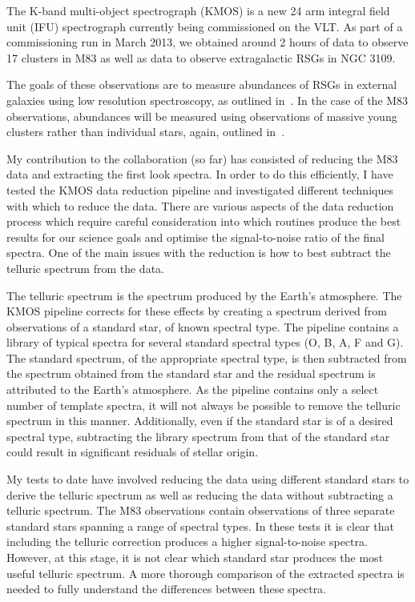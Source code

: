 \documentclass[a4paper,12pt]{article}
\begin{document}
The K-band multi-object spectrograph (KMOS) is a new 24 arm integral field unit (IFU) spectrograph currently being commissioned on the VLT. 
As part of a commissioning run in March 2013, we obtained around 2 hours of data to observe 17 clusters in M83 as well as data to observe extragalactic RSGs in NGC 3109.
 
The goals of these observations are to measure abundances of RSGs in external galaxies using low resolution spectroscopy, as outlined in~\cite{Davies13b}.
In the case of the M83 observations, abundances will be measured using observations of massive young clusters rather than individual stars, again, outlined in~\cite{Davies13b}.

My contribution to the collaboration (so far) has consisted of reducing the M83 data and extracting the first look spectra. 
In order to do this efficiently, I have tested the KMOS data reduction pipeline and investigated different techniques with which to reduce the data. 
There are various aspects of the data reduction process which require careful consideration into which routines produce the best results for our science goals and optimise the signal-to-noise ratio of the final spectra. 
One of the main issues with the reduction is how to best subtract the telluric spectrum from the data.

The telluric spectrum is the spectrum produced by the Earth's atmosphere. 
The KMOS pipeline corrects for these effects by creating a spectrum derived from observations of a standard star, of known spectral type. 
The pipeline contains a library of typical spectra for several standard spectral types (O, B, A, F and G). 
The standard spectrum, of the appropriate spectral type, is then subtracted from the spectrum obtained from the standard star and the residual spectrum is attributed to the Earth's atmosphere. 
As the pipeline contains only a select number of template spectra, it will not always be possible to remove the telluric spectrum in this manner. 
Additionally, even if the standard star is of a desired spectral type, subtracting the library spectrum from that of the standard star could result in significant residuals of stellar origin. 

My tests to date have involved reducing the data using different standard stars to derive the telluric spectrum as well as reducing the data without subtracting a telluric spectrum. 
The M83 observations contain observations of three separate standard stars spanning a range of spectral types. 
In these tests it is clear that including the telluric correction produces a higher signal-to-noise spectra. 
However, at this stage, it is not clear which standard star produces the most useful telluric spectrum. 
A more thorough comparison of the extracted spectra is needed to fully understand the differences between these spectra. 
\end{document}
